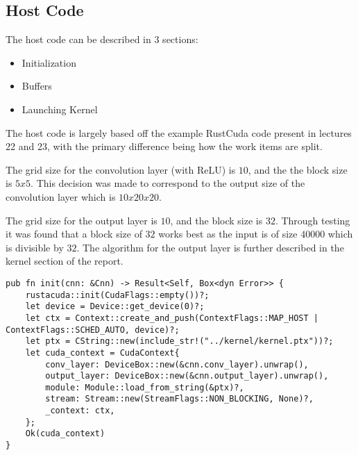 \documentclass[12pt]{article}
\begin{document}
\subsection{Host Code}
The host code can be described in 3 sections:
\begin{itemize}
    \item Initialization
    \item Buffers
    \item Launching Kernel
\end{itemize}
The host code is largely based off the example RustCuda code present in lectures 22 and 23, with the primary difference being how the work items are split.

The grid size for the convolution layer (with ReLU) is $10$, and the the block size is $5x5$. This decision was made to correspond to the output size of the convolution layer which is $10x20x20$.

The grid size for the output layer is $10$, and the block size is $32$. Through testing it was found that a block size of $32$ works best as the input is of size $40000$ which is divisible by $32$. The algorithm for the output layer is further described in the kernel section of the report.

\begin{verbatim}
pub fn init(cnn: &Cnn) -> Result<Self, Box<dyn Error>> {
    rustacuda::init(CudaFlags::empty())?;
    let device = Device::get_device(0)?;
    let ctx = Context::create_and_push(ContextFlags::MAP_HOST | ContextFlags::SCHED_AUTO, device)?;
    let ptx = CString::new(include_str!("../kernel/kernel.ptx"))?;
    let cuda_context = CudaContext{
        conv_layer: DeviceBox::new(&cnn.conv_layer).unwrap(),
        output_layer: DeviceBox::new(&cnn.output_layer).unwrap(),
        module: Module::load_from_string(&ptx)?,
        stream: Stream::new(StreamFlags::NON_BLOCKING, None)?,
        _context: ctx,
    };
    Ok(cuda_context)
}
    \end{verbatim}
\end{document}
